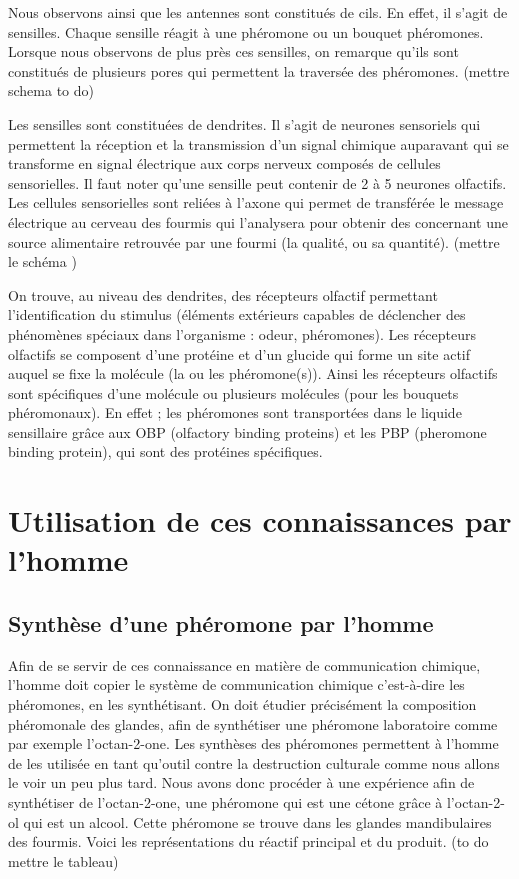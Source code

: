 Nous observons ainsi que les antennes sont constitués de cils. En effet,
il s'agit de sensilles. Chaque sensille réagit à une phéromone ou un
bouquet phéromones. Lorsque nous observons de plus près ces sensilles,
on remarque qu'ils sont constitués de plusieurs pores qui permettent la
traversée des phéromones. (mettre schema to do)

Les sensilles sont constituées de dendrites. Il s'agit de neurones
sensoriels qui permettent la réception et la transmission d'un signal
chimique auparavant qui se transforme en signal électrique aux corps
nerveux composés de cellules sensorielles. Il faut noter qu'une sensille
peut contenir de 2 à 5 neurones olfactifs. Les cellules sensorielles
sont reliées à l'axone qui permet de transférée le message électrique au
cerveau des fourmis qui l'analysera pour obtenir des concernant une
source alimentaire retrouvée par une fourmi (la qualité, ou sa
quantité). (mettre le schéma )

On trouve, au niveau des dendrites, des récepteurs olfactif permettant
l'identification du stimulus (éléments extérieurs capables de déclencher
des phénomènes spéciaux dans l'organisme : odeur, phéromones). Les
récepteurs olfactifs se composent d'une protéine et d'un glucide qui
forme un site actif auquel se fixe la molécule (la ou les phéromone(s)).
Ainsi les récepteurs olfactifs sont spécifiques d'une molécule ou
plusieurs molécules (pour les bouquets phéromonaux). En effet ; les
phéromones sont transportées dans le liquide sensillaire grâce aux OBP
(olfactory binding proteins) et les PBP (pheromone binding protein), qui
sont des protéines spécifiques.

\section{Utilisation de ces connaissances par l'homme}

\subsection{Synthèse d'une phéromone par l'homme}

Afin de se servir de ces connaissance en matière de communication
chimique, l'homme doit copier le système de communication chimique
c'est-à-dire les phéromones, en les synthétisant. On doit étudier
précisément la composition phéromonale des glandes, afin de synthétiser
une phéromone laboratoire comme par exemple l'octan-2-one. Les synthèses
des phéromones permettent à l'homme de les utilisée en tant qu'outil
contre la destruction culturale comme nous allons le voir un peu plus
tard. Nous avons donc procéder à une expérience afin de synthétiser de
l'octan-2-one, une phéromone qui est une cétone grâce à l'octan-2-ol qui
est un alcool. Cette phéromone se trouve dans les glandes mandibulaires
des fourmis. Voici les représentations du réactif principal et du
produit. (to do mettre le tableau)

